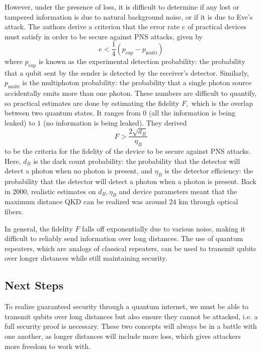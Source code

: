 \documentclass{article}
\numberwithin{equation}{section}
\begin{document}
However, under the presence of loss, it is difficult to determine if any lost or tampered information is due to natural background noise, or if it is due to Eve's attack. The authors derive a criterion that the error rate $e$ of practical devices must satisfy in order to be secure against PNS attacks, given by 
\begin{equation}
    e < \frac{1}{4}(p_\text{exp} - p_\text{multi})
\end{equation}
where $p_\text{exp}$ is known as the experimental detection probability: the probability that a qubit sent by the sender is detected by the receiver's detector. Similarly, $p_\text{multi}$ is the multiphoton probability: the probability that a single photon source accidentally emits more than one photon. These numbers are difficult to quantify, so practical estimates are done by estimating the fidelity $F,$ which is the overlap between two quantum states. It ranges from $0$ (all the information is being leaked) to $1$ (no information is being leaked). They derived 
\begin{equation}
    F > \frac{2\sqrt{d_B}}{\eta_B}
\end{equation}
to be the criteria for the fidelity of the device to be secure against PNS attacks. Here, $d_B$ is the dark count probability: the probability that the detector will detect a photon when no photon is present, and $\eta_B$ is the detector efficiency: the probability that the detector will detect a photon when a photon is present. Back in 2000, realistic estimates on $d_B,\eta_B$ and device parameters meant that the maximum distance QKD can be realized was around $24\text{ km}$ through optical fibers.

In general, the fidelity $F$ falls off exponentially due to various noise, making it difficult to reliably send information over long distances. The use of quantum repeaters, which are analogs of classical repeaters, can be used to transmit qubits over longer distances while still maintaining security.
\subsection{Next Steps}
To realize guaranteed security through a quantum internet, we must be able to transmit qubits over long distances but also ensure they cannot be attacked, i.e. a full security proof is necessary. These two concepts will always be in a battle with one another, as longer distances will include more loss, which gives attackers more freedom to work with.  
\end{document}

